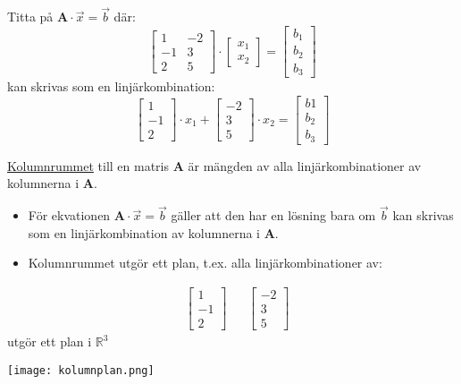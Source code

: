 Titta på $\mathbf{A} \cdot \vec{x} = \vec{b}$ där:
\[
    \begin{bmatrix} 1&-2\\-1&3\\2&5 \end{bmatrix} \cdot \begin{bmatrix} x_1\\x_2 \end{bmatrix} = \begin{bmatrix} b_1\\b_2\\b_3 \end{bmatrix}
\]
kan skrivas som en linjärkombination:
\[
    \begin{bmatrix} 1\\-1\\2 \end{bmatrix} \cdot x_1 + \begin{bmatrix} -2\\3\\5 \end{bmatrix} \cdot x_2 = \begin{bmatrix} b1\\b_2\\b_3 \end{bmatrix}
\]
\begin{Def}
    \underline{Kolumnrummet} till en matris \textbf{A} är mängden av alla linjärkombinationer av kolumnerna i \textbf{A}.
\end{Def}
\begin{itemize}
	\item För ekvationen $\mathbf{A} \cdot \vec{x} = \vec{b}$ gäller att den har en lösning bara om $\vec{b}$ kan skrivas som en linjärkombination av kolumnerna i \textbf{A}.
	\item Kolumnrummet utgör ett plan, t.ex. alla linjärkombinationer av:
\end{itemize}
\begin{align*}
&\begin{bmatrix} 1\\-1\\2 \end{bmatrix}
&&\begin{bmatrix} -2\\3\\5 \end{bmatrix}
\end{align*}
utgör ett plan i $\mathbb{R}^3$
\begin{center}
	\texttt{[image: kolumnplan.png]}
\end{center}
